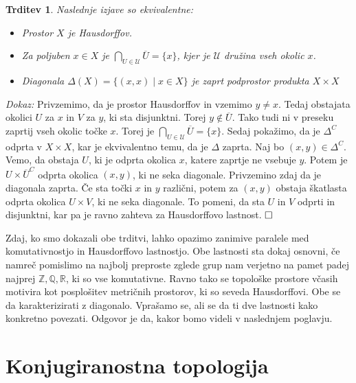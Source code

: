 \documentclass[a4paper,12pt]{article}
\def\Z{\mathbb{Z}} %
\def\Q{\mathbb{Q}} %
\def\R{\mathbb{R}} %
\def\qed{$\hfill\Box$}   %
\newtheorem{trditev}{Trditev}
\begin{document}
\begin{trditev}
    Naslednje izjave so ekvivalentne:
    \begin{itemize}
        \item[\rm (i)] Prostor $X$ je Hausdorffov.
        \item[\rm (ii)] Za poljuben $x \in X$ je $\bigcap_{U \in \mathcal{U}} \overline{U} = \{x\}$, kjer je $\mathcal{U}$ družina vseh okolic $x$.
        \item[\rm (iii)] Diagonala $\Delta(X) = \{(x,x) \mid x \in X \} $ je zaprt podprostor produkta $X \times X$
    \end{itemize}
\end{trditev}

\noindent
{\em Dokaz:\/}
    Privzemimo, da je prostor Hausdorffov in vzemimo $y \neq x$. Tedaj obstajata okolici $U$ za $x$ in $V$ za $y$, ki sta disjunktni. Torej $y \notin \overline{U}$.
    Tako tudi ni v preseku zaprtij vseh okolic točke $x$. Torej je $\bigcap_{U \in \mathcal{U}} \overline{U} = \{x\}$.
    Sedaj pokažimo, da je $\Delta^C$ odprta v $X \times X$, kar je ekvivalentno temu, da je $\Delta$ zaprta.
    Naj bo $(x,y) \in \Delta^C$. Vemo, da obstaja $U$, ki je odprta okolica $x$, katere zaprtje ne vsebuje $y$.
    Potem je $U \times \overline{U}^C$ odprta okolica $(x,y)$, ki ne seka diagonale.
    Privzemino zdaj da je diagonala zaprta. Če sta točki $x$ in $y$ različni, potem za $(x,y)$ obstaja škatlasta odprta okolica $U \times V$, ki ne seka diagonale.
    To pomeni, da sta $U$ in $V$ odprti in disjunktni, kar pa je ravno zahteva za Hausdorffovo lastnost. \qed



Zdaj, ko smo dokazali obe trditvi, lahko opazimo zanimive paralele med komutativnostjo in Hausdorffovo lastnostjo. Obe lastnosti sta dokaj osnovni,
če namreč pomislimo na najbolj preproste zglede grup nam verjetno na pamet padej najprej $\Z, \Q, \R$, ki so vse komutativne.
Ravno tako se topološke prostore včasih motivira kot posplošitev metričnih prostorov, ki so seveda Hausdorffovi.
Obe se da karakterizirati z diagonalo.
Vprašamo se, ali se da ti dve lastnosti kako konkretno povezati. Odgovor je da, kakor bomo videli v naslednjem poglavju.





\section{Konjugiranostna topologija}
\end{document}
